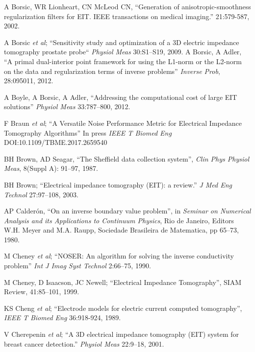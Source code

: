 \documentclass[12pt]{article} \usepackage[margin=3cm]{geometry} \usepackage[margin=20pt,font=small,labelfont=bf]{caption}\def\TBLWIDA{35mm}\def\TBLWIDB{95mm}
\newcommand{\ifmaxthree}[2]{#2 {\em et al}; }
\begin{document}
\begin{thebibliography}{00}
A Borsic, WR Lionheart, CN McLeod CN,
``Generation of anisotropic-smoothness regularization filters for EIT. IEEE transactions on medical imaging.''
21:579-587, 2002.

\ifmaxthree{
A Borsic, R Halter R, Y Wan, A Hartov, KD Paulsen,
}{
A Borsic
}
``Sensitivity study and optimization of a 3D electric impedance tomography prostate probe``
{\em Physiol Meas} 30:S1--S19, 2009.
A Borsic, A Adler,
``A primal dual-interior point framework for using the L1-norm or the L2-norm on the data and regularization terms of inverse problems''
{\em Inverse Prob}, 28:095011, 2012.

A Boyle, A Borsic, A Adler,
``Addressing the computational cost of large EIT solutions''
{\em Physiol Meas} 33:787--800, 2012.

\ifmaxthree{
F Braun, M Proença, J Solà, J-P Thiran, A Adler
}{
F Braun
}
``A Versatile Noise Performance Metric for
Electrical Impedance Tomography Algorithms''
In press {\em IEEE T Biomed Eng} DOI:10.1109/TBME.2017.2659540

BH Brown, AD Seagar,
``The Sheffield data collection system'',
{\em Clin Phys Physiol Meas}, 8(Suppl A): 91--97, 1987.

BH Brown;
``Electrical impedance tomography (EIT): a review.''
{\em  J Med Eng Technol} 27:97--108, 2003.

AP Calderón,
``On an inverse boundary value problem'', in
{\em Seminar on Numerical Analysis and its Applications to Continuum Physics}, Rio de Janeiro, Editors W.H. Meyer and M.A. Raupp, Sociedade Brasileira de Matematica, pp 65--73, 1980.

\ifmaxthree{
M Cheney, D Isaacson, JC Newell, S Simske, J Goble.
}{
M Cheney
}
``NOSER: An algorithm for solving the inverse conductivity problem''
{\em Int J Imag Syst Technol} 2:66--75, 1990.

M Cheney, D Isaacson, JC Newell;
``Electrical Impedance Tomography'',
SIAM Review, 41:85--101, 1999.

\ifmaxthree{
KS Cheng, D Isaacson, JC Newell, DG Gisser DG,
}{
KS Cheng
}
``Electrode models for electric current computed tomography'',
{\em IEEE T Biomed Eng} 36:918-924, 1989.

\ifmaxthree{
V Cherepenin, A Karpov, A Korjenevsky, V Kornienko, A Mazaletskaya, D Mazourov, D Meister
}{
V Cherepenin
}
``A 3D electrical impedance tomography (EIT) system for breast cancer detection.''
{\em Physiol Meas} 22:9--18, 2001. %


\end{thebibliography}
\end{document}
